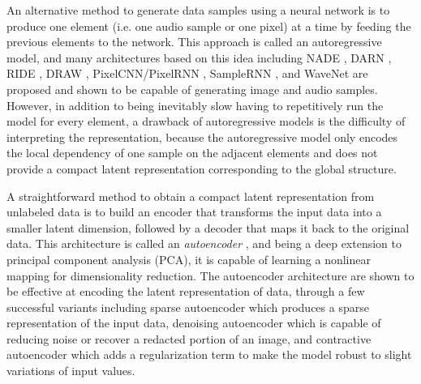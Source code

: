 An alternative method to generate data samples using a neural network is to produce one element (i.e. one audio sample or one pixel) at a time by feeding the previous elements to the network.
This approach is called an autoregressive model, and many architectures based on this idea including NADE \cite{larochelle2011nade}, DARN \cite{gregor2013darn}, RIDE \cite{theis2015ride}, DRAW \cite{gregor2015draw}, PixelCNN/PixelRNN \cite{oord2016pixel}, SampleRNN \cite{mehri2016samplernn}, and WaveNet \cite{oord2016wavenet} are proposed and shown to be capable of generating image and audio samples.
However, in addition to being inevitably slow having to repetitively run the model for every element, a drawback of autoregressive models is the difficulty of interpreting the representation, because the autoregressive model only encodes the local dependency of one sample on the adjacent elements and does not provide a compact latent representation corresponding to the global structure.


A straightforward method to obtain a compact latent representation from unlabeled data is to build an encoder that transforms the input data into a smaller latent dimension, followed by a decoder that maps it back to the original data.
This architecture is called an \emph{autoencoder} \cite{bengio2009deeplearning}, and being a deep extension to principal component analysis (PCA), it is capable of learning a nonlinear mapping for dimensionality reduction.
The autoencoder architecture are shown to be effective at encoding the latent representation of data, through a few successful variants including sparse autoencoder \cite{ng2011sparse} which produces a sparse representation of the input data, denoising autoencoder \cite{vincent2008denoising} which is capable of reducing noise or recover a redacted portion of an image, and contractive autoencoder \cite{rifai2011contractive} which adds a regularization term to make the model robust to slight variations of input values.


